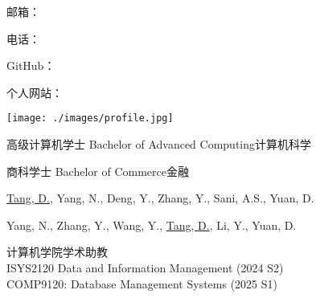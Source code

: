 \documentclass[11pt]{article}
\begin{document}
\begin{minipage}[t]{0.65\textwidth}
  \hspace{-21pt}
  {\Huge \MyNameCN}

  \vspace{1em}
  \hspace{-20pt}
  邮箱：\MyEmail 

  \hspace{-20pt}
	电话：\MyPhone 

  \hspace{-20pt}
	GitHub：\href{\MyGitHub}{\MyGitHub}

  \hspace{-20pt}
	个人网站：\href{\MyWebsite}{\MyWebsite}
\end{minipage}
\hspace{42pt}
\begin{minipage}[t]{0.2\textwidth}
  \vspace{-35pt} %
  \texttt{[image: ./images/profile.jpg]} 
\end{minipage}
\hfill

\vspace{1em}


{高级计算机学士 Bachelor of Advanced Computing}{计算机科学}

{商科学士 Bachelor of Commerce}{金融}


{\underline{Tang, D.}, Yang, N., Deng, Y., Zhang, Y., Sani, A.S., Yuan, D.}

{Yang, N., Zhang, Y., Wang, Y., \underline{Tang, D.}, Li, Y., Yuan, D.}


{计算机学院学术助教}
{\\
ISYS2120 Data and Information Management (2024 S2) \\
COMP9120: Database Management Systems (2025 S1)
}
\end{document}
